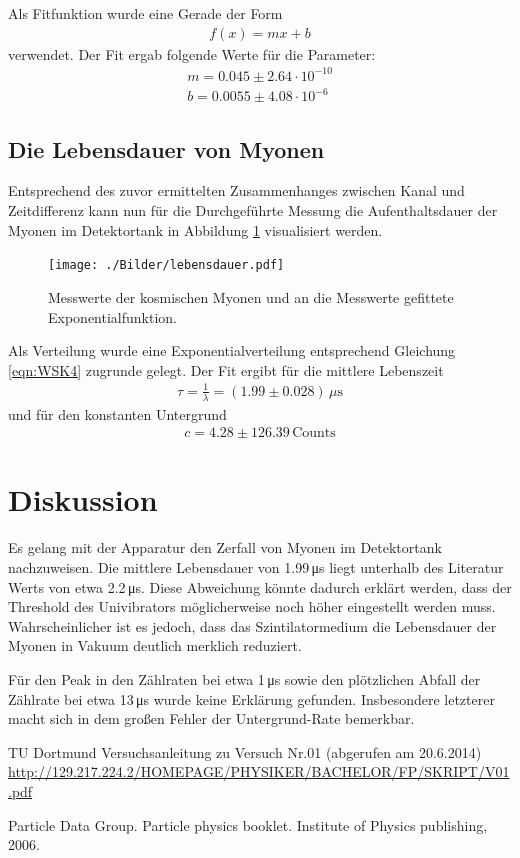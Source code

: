 Als Fitfunktion wurde eine Gerade der Form
\begin{align}
	f(x) = mx + b
\end{align}
verwendet. Der Fit ergab folgende Werte für die Parameter:
\begin{align}
	m = 0.045 \pm 2.64\cdot10^{-10}\\
	b = 0.0055 \pm 4.08 \cdot 10^{-6}
\end{align}

\subsection{Die Lebensdauer von Myonen}
Entsprechend des zuvor ermittelten Zusammenhanges zwischen Kanal und Zeitdifferenz kann nun für die Durchgeführte Messung die Aufenthaltsdauer der Myonen im Detektortank in Abbildung \ref{fig:lebensdauer} visualisiert werden.

\begin{figure}[htbp]
	\texttt{[image: ./Bilder/lebensdauer.pdf]}
	\caption{Messwerte der kosmischen Myonen und an die Messwerte gefittete Exponentialfunktion.}
	\label{fig:lebensdauer}
\end{figure}

Als Verteilung wurde eine Exponentialverteilung entsprechend Gleichung \ref{eqn:WSK4} zugrunde gelegt. Der Fit ergibt für die mittlere Lebenszeit
\begin{align}
	\tau = \frac{1}{\lambda} = (1.99 \pm 0.028)\,\text{$\mu$s}
\end{align}
und für den konstanten Untergrund
\begin{align}
c = 4.28 \pm 126.39\,\text{Counts}
\end{align}

\section{Diskussion}
Es gelang mit der Apparatur den Zerfall von Myonen im Detektortank nachzuweisen. Die mittlere Lebensdauer von 1.99\,\si{\micro \second} liegt unterhalb des Literatur Werts von etwa 2.2\,\si{\micro\second}. Diese Abweichung könnte dadurch erklärt werden, dass der Threshold des Univibrators möglicherweise noch höher eingestellt werden muss. Wahrscheinlicher ist es jedoch, dass das Szintilatormedium die Lebensdauer der Myonen in Vakuum deutlich merklich reduziert.

Für den Peak in den Zählraten bei etwa 1\,\si{\micro\second} sowie den plötzlichen Abfall der Zählrate bei etwa 13\,\si{\micro\second} wurde keine Erklärung gefunden. Insbesondere letzterer macht sich in dem großen Fehler der Untergrund-Rate bemerkbar.

\clearpage
\begin{thebibliography}{WissOnl}
 TU Dortmund Versuchsanleitung zu Versuch Nr.01 (abgerufen am 20.6.2014) \url{http://129.217.224.2/HOMEPAGE/PHYSIKER/BACHELOR/FP/SKRIPT/V01.pdf}

 Particle Data Group. Particle physics booklet. Institute of Physics publishing, 2006.

\end{thebibliography}

